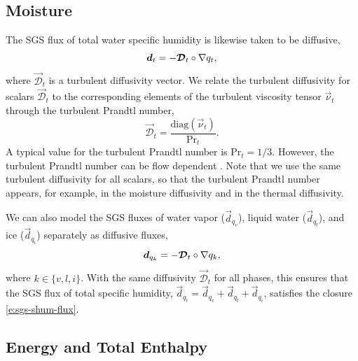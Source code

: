 \documentclass{report}
\begin{document}
\subsection{Moisture}

The SGS flux of total water specific humidity is likewise taken to be diffusive,
\begin{equation}\label{e:sgs-shum-flux}
\boldsymbol{{d}}_{t} = - \boldsymbol{{\mathcal{D}}}_t \circ \nabla q_t,
\end{equation}
where $\vec{\mathcal{D}}_t$ is a turbulent diffusivity vector. We relate the turbulent diffusivity for scalars $\vec{\mathcal{D}}_t$ to the corresponding elements of the turbulent viscosity tensor $\vec{\nu}_t$ through the turbulent Prandtl number, 
\begin{equation}\label{e:Prandtl_number}
\vec{\mathcal{D}}_t = \frac{\mathrm{diag}(\vec{\nu}_t)}{\mathrm{Pr}_{t}}.
\end{equation} 
A typical value for the turbulent Prandtl number is $\mathrm{Pr}_{t} = 1/3$. However, the turbulent Prandtl number can be flow dependent \citep[e.g.,][]{Deardorff80a}. Note that we use the same turbulent diffusivity for all scalars, so that the turbulent Prandtl number appears, for example, in the moisture diffusivity and in the thermal diffusivity.

We can also model the SGS fluxes of water vapor ($\vec{d}_{q_v}$), liquid water ($\vec{d}_{q_l}$), and ice ($\vec{d}_{q_i}$) separately as diffusive fluxes, 
\begin{equation}\label{e:water_diffusion}
    \boldsymbol{{d}}_{q_k} = - \boldsymbol{{\mathcal{D}}}_t \circ \nabla q_k,
\end{equation}
where $k \in \{v, l, i\}$. With the same diffusivity $\vec{\mathcal{D}}_t$ for all phases, this ensures that the SGS flux of total specific humidity, $\vec{d}_{q_t} = \vec{d}_{q_v} + \vec{d}_{q_l} + \vec{d}_{q_i}$, satisfies the closure \eqref{e:sgs-shum-flux}.

\subsection{Energy and Total Enthalpy}\label{s:energy_total_enthalpy}
\end{document}
